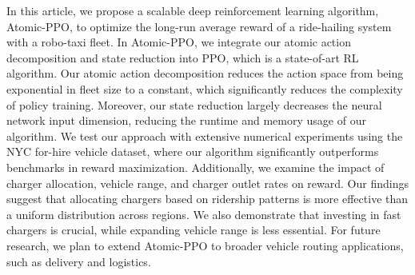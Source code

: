 In this article, we propose a scalable deep reinforcement learning algorithm, Atomic-PPO, to optimize the long-run average reward of a ride-hailing system with a robo-taxi fleet. In Atomic-PPO, we integrate our atomic action decomposition and state reduction into PPO, which is a state-of-art RL algorithm. Our atomic action decomposition reduces the action space from being exponential in fleet size to a constant, which significantly reduces the complexity of policy training. Moreover, our state reduction largely decreases the neural network input dimension, reducing the runtime and memory usage of our algorithm. We test our approach with extensive numerical experiments using the NYC for-hire vehicle dataset, where our algorithm significantly outperforms benchmarks in reward maximization. Additionally, we examine the impact of charger allocation, vehicle range, and charger outlet rates on reward. Our findings suggest that allocating chargers based on ridership patterns is more effective than a uniform distribution across regions. We also demonstrate that investing in fast chargers is crucial, while expanding vehicle range is less essential. For future research, we plan to extend Atomic-PPO to broader vehicle routing applications, such as delivery and logistics. 